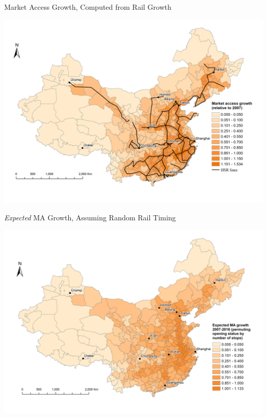 \documentclass{beamer}
\begin{document}
\begin{frame}{Market Access Growth, Computed from Rail Growth}
\vspace{-1cm}
\begin{center}
\includegraphics[scale=0.4]{./lecture_includes/Line_panel2016.png}
\end{center}

\end{frame}

\begin{frame}{\emph{Expected} MA Growth, Assuming Random Rail Timing}
\vspace{-1cm}
\begin{center}
\includegraphics[scale=0.4]{./lecture_includes/NlinkExpected2016.png}
\end{center}

\end{frame}
\end{document}
